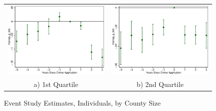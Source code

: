 \documentclass[11pt,letterpaper]{article}
\begin{document}
\begin{figure}\caption{Event Study Estimates, Individuals, by County Size}
\begin{tabular}{cc}
\includegraphics[scale=0.57]{tabfig/evstu_size1_snap_p_tot_one_yrcfcttr_5_3}&\includegraphics[scale=0.57]{tabfig/evstu_size2_snap_p_tot_one_yrcfcttr_5_3}\\
a) 1st Quartile&b) 2nd Quartile\\

\end{tabular}
\end{figure}
\end{document}

